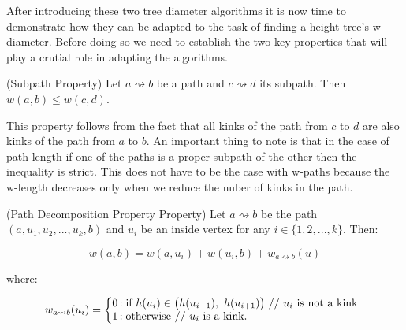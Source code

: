 
After introducing these two tree diameter algorithms it is now time to demonstrate how they can be adapted to the task of finding a height tree's w-diameter. Before doing so we need to establish the two key properties that will play a crutial role in adapting the algorithms.


\begin{defn} (Subpath Property) Let $a \rightsquigarrow b$ be a path and $c \rightsquigarrow d$ its subpath. Then $w(a, b) \le w(c, d)$. \end{defn}

This property follows from the fact that all kinks of the path from $c$ to $d$ are also kinks of the path from $a$ to $b$. An important thing to note is that in the case of path length if one of the paths is a proper subpath of the other then the inequality is strict. This does not have to be the case with w-paths because the w-length decreases only when we reduce the nuber of kinks in the path.

\begin{defn} (Path Decomposition Property Property) Let $a \rightsquigarrow b$ be the path $(a, u_1, u_2, ..., u_k, b)$ and $u_i$ be an inside vertex for any $i \in \{1, 2, ..., k\}$. Then: \end{defn}

    $$w(a, b) = w(a, u_i) + w(u_i, b) + w_{a \rightsquigarrow b}(u)$$

   where:

   $$
   w_{a \rightsquigarrow b}(u_i) = \left\{
       \begin{array}{@{}l@{\thinspace}l}
           \text{0}  &: \text{if } h(u_i) \in \big(h(u_{i-1}),~h(u_{i+1}) \big) \text{ // $u_i$ is not a kink} \\
           \text{1} &: \text{otherwise // $u_i$ is a kink.} \\
       \end{array}
   \right.
   $$

